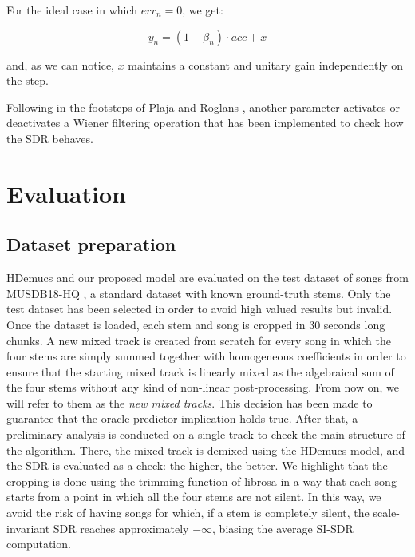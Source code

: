 \documentclass{article}
\begin{document}
\begin{sloppy}
For the ideal case in which $err_n=0$, we get:

\begin{equation}
  \label{eqn:schedule3}
    y_n=(1-\beta_n)\cdot acc + x
\end{equation}

and, as we can notice, $x$ maintains a constant and unitary gain independently on the step.


Following in the footsteps of Plaja and Roglans \cite{Plaja-Roglans_2022}, another parameter activates or deactivates a Wiener filtering operation that has been implemented to check how the SDR behaves.




\section{Evaluation}
\label{sec:evaluation}


\subsection{Dataset preparation}
\label{sec:preparation}

HDemucs and our proposed model are evaluated on the test dataset of songs from MUSDB18-HQ \cite{MUSDB18-HQd}, a standard dataset with known ground-truth stems. Only the test dataset has been selected in order to avoid high valued results but invalid. Once the dataset is loaded, each stem and song is cropped in 30 seconds long chunks.
A new mixed track is created from scratch for every song in which the four stems are simply summed together with homogeneous coefficients in order to ensure that the starting mixed track is linearly mixed as the algebraical sum of the four stems without any kind of non-linear post-processing. From now on, we will refer to them as the \textit{new mixed tracks}.
This decision has been made to guarantee that the oracle predictor implication holds true.
After that, a preliminary analysis is conducted on a single track to check the main structure of the algorithm. There, the mixed track is demixed using the HDemucs model, and the SDR is evaluated as a check: the higher, the better.
We highlight that the cropping is done using the trimming function of librosa \cite{mcfee_librosa_effects_trim_2025} in a way that each song starts from a point in which all the four stems are not silent. In this way, we avoid the risk of having songs for which, if a stem is completely silent, the scale-invariant SDR reaches approximately $-\infty$, biasing the average SI-SDR computation.


\end{sloppy}
\end{document}
